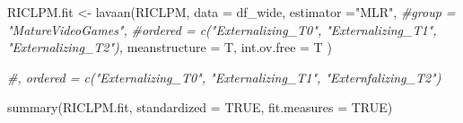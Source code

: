 \documentclass{article}
\newenvironment{Shaded}{\begin{snugshade}}{\end{snugshade}}
\newcommand{\AttributeTok}[1]{\textcolor[rgb]{0.77,0.63,0.00}{#1}}
\newcommand{\CommentTok}[1]{\textcolor[rgb]{0.56,0.35,0.01}{\textit{#1}}}
\newcommand{\ConstantTok}[1]{\textcolor[rgb]{0.00,0.00,0.00}{#1}}
\newcommand{\FunctionTok}[1]{\textcolor[rgb]{0.00,0.00,0.00}{#1}}
\newcommand{\NormalTok}[1]{#1}
\newcommand{\OtherTok}[1]{\textcolor[rgb]{0.56,0.35,0.01}{#1}}
\newcommand{\StringTok}[1]{\textcolor[rgb]{0.31,0.60,0.02}{#1}}
\begin{document}
\begin{Shaded}
\begin{Highlighting}[]
\NormalTok{RICLPM.fit }\OtherTok{\textless{}{-}} \FunctionTok{lavaan}\NormalTok{(RICLPM, }
  \AttributeTok{data =}\NormalTok{ df\_wide,}
  \AttributeTok{estimator =}\StringTok{"MLR"}\NormalTok{,}
  \CommentTok{\#group = "MatureVideoGames",}
  \CommentTok{\#ordered = c("Externalizing\_T0", "Externalizing\_T1", "Externalizing\_T2"),}
  \AttributeTok{meanstructure =}\NormalTok{ T, }
  \AttributeTok{int.ov.free =}\NormalTok{ T}
\NormalTok{)}

\CommentTok{\#, ordered = c("Externalizing\_T0", "Externalizing\_T1", "Externfalizing\_T2")}

\FunctionTok{summary}\NormalTok{(RICLPM.fit, }\AttributeTok{standardized =} \ConstantTok{TRUE}\NormalTok{, }\AttributeTok{fit.measures =} \ConstantTok{TRUE}\NormalTok{)}
\end{Highlighting}
\end{Shaded}
\end{document}
